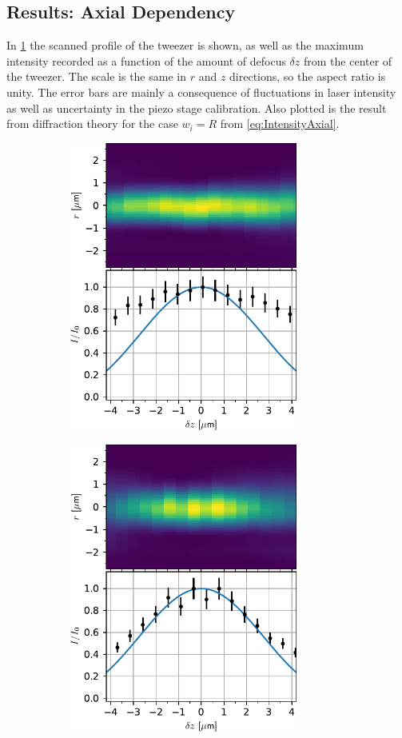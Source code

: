 \subsection{Results: Axial Dependency}

In \cref{fig:AxialUncorrected} the scanned profile of the tweezer is shown, as well as the maximum intensity recorded as a function of the amount of defocus $\delta z$ from the center of the tweezer.
The scale is the same in $r$ and $z$ directions, so the aspect ratio is unity.
The error bars are mainly a consequence of fluctuations in laser intensity as well as uncertainty in the piezo stage calibration.
Also plotted is the result from diffraction theory for the case $w_i =R$ from \cref{eq:IntensityAxial}.

\begin{figure}
\centering
	\begin{subfigure}{.49\textwidth}
	    \flushleft
		\includegraphics[height=9.5cm]{figures/AxialImageTweezerScanUncorrected.pdf}
		\caption{}
		\label{fig:AxialUncorrected}
	\end{subfigure}
	\begin{subfigure}{.49\textwidth}
		\flushright
		\includegraphics[height=9.5cm]{figures/AxialImageTweezerScan.pdf}

\end{subfigure}
\end{figure}

